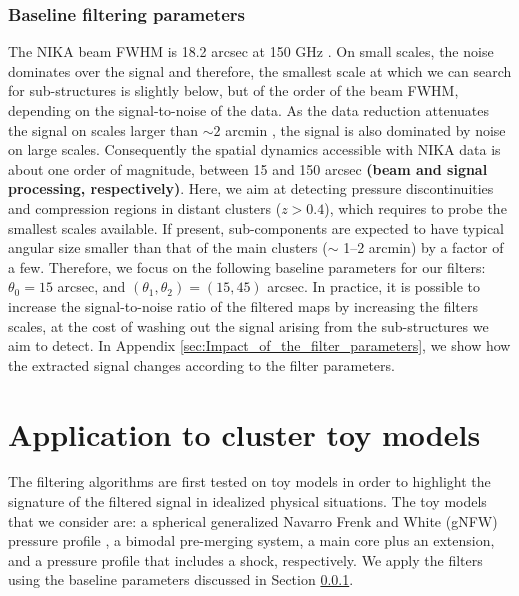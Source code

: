 \documentclass[twocolumn,traditabstract]{aa}
\begin{document}
\subsubsection{Baseline filtering parameters}\label{sec:Baseline_filtering_parameters}
The NIKA beam FWHM is 18.2 arcsec at 150 GHz \citep{Catalano2014}. On small scales, the noise dominates over the signal and therefore, the smallest scale at which we can search for sub-structures is slightly below, but of the order of the beam FWHM, depending on the signal-to-noise of the data. As the data reduction attenuates the signal on scales larger than $\sim 2$ arcmin \citep[see][and Section \ref{sec:Systematics_and_noise_properties}]{Adam2015}, the signal is also dominated by noise on large scales. Consequently the spatial dynamics accessible with NIKA data is about one order of magnitude, between 15 and 150 arcsec {\bf (beam and signal processing, respectively)}. Here, we aim at detecting pressure discontinuities and compression regions in distant clusters ($z>0.4$), which requires to probe the smallest scales available. If present, sub-components are expected to have typical angular size smaller than that of the main clusters ($\sim$ 1--2 arcmin) by a factor of a few. Therefore, we focus on the following baseline parameters for our filters: $\theta_0 = 15$ arcsec, and $\left(\theta_1, \theta_2\right) = \left(15, 45\right)$ arcsec. In practice, it is possible to increase the signal-to-noise ratio of the filtered maps by increasing the filters scales, at the cost of washing out the signal arising from the sub-structures we aim to detect. In Appendix \ref{sec:Impact_of_the_filter_parameters}, we show how the extracted signal changes according to the filter parameters.

\section{Application to cluster toy models}\label{sec:Application_to_toy_models}
The filtering algorithms are first tested on toy models in order to highlight the signature of the filtered signal in idealized physical situations. The toy models that we consider are: a spherical generalized Navarro Frenk and White (gNFW) pressure profile \citep{Nagai2007}, a bimodal pre-merging system, a main core plus an extension, and a pressure profile that includes a shock, respectively. We apply the filters using the baseline parameters discussed in Section \ref{sec:Baseline_filtering_parameters}.
\end{document}
